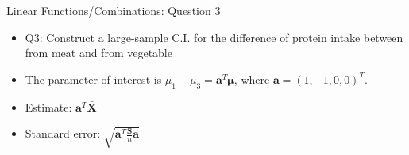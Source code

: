 \documentclass[
  ignorenonframetext,
]{beamer}
\providecommand{\tightlist}{%
  \setlength{\itemsep}{0pt}\setlength{\parskip}{0pt}}
\begin{document}
\begin{frame}{Linear Functions/Combinations: Question 3}
\protect\hypertarget{linear-functionscombinations-question-3}{}
\begin{itemize}
\tightlist
\item
  Q3: Construct a large-sample C.I. for the difference of protein intake
  between from meat and from vegetable
\item
  The parameter of interest is
  \(\mu_1 - \mu_3=\mathbf a^T \boldsymbol \mu\), where
  \(\mathbf a=(1, -1, 0, 0)^T\).
\item
  Estimate: \(\mathbf a^T \bar{\mathbf X}\)
\item
  Standard error: \(\sqrt{\mathbf a^T\frac{\mathbf S}{n} \mathbf a}\)
\end{itemize}
\end{frame}
\end{document}
